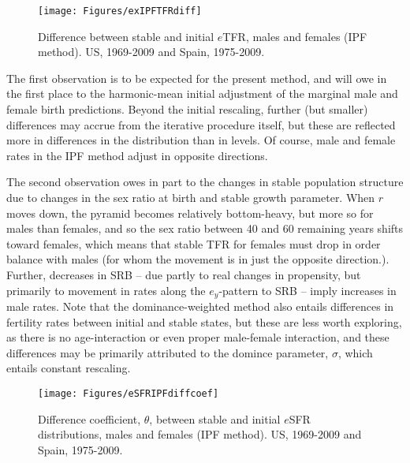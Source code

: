 \begin{figure}[ht!]
        \centering  
          \caption{Difference between stable and initial $e$TFR, males and
          females (IPF method). US, 1969-2009 and Spain,
          1975-2009.}
           \texttt{[image: Figures/exIPFTFRdiff]}
          \label{fig:exIPFTFRdiff}
\end{figure}

The first observation
is to be expected for the present method, and will owe in the first place to the
harmonic-mean initial adjustment of the marginal male and female birth
predictions. Beyond the initial rescaling, further (but smaller) differences may
accrue from the iterative procedure itself, but these are reflected more in
differences in the distribution than in levels. Of course, male and female rates
in the IPF method adjust in opposite directions. 

The second observation owes
in part to the changes in stable population structure due to changes in the sex
ratio at birth and stable growth parameter. When $r$ moves down, the pyramid
becomes relatively bottom-heavy, but more so for males than females, and so the
sex ratio between 40 and 60 remaining years shifts toward females, which means
that stable TFR for females must drop in order balance with males (for whom the
movement is in just the opposite direction.). Further, decreases in SRB -- due
partly to real changes in propensity, but primarily to movement in rates
along the $e_y$-pattern to SRB -- imply increases in male rates. Note that the
dominance-weighted method also entails differences in fertility rates
between initial and stable states, but these are less worth exploring, as there
is no age-interaction or even proper male-female interaction, and these
differences may be primarily attributed to the domince parameter, $\sigma$,
which entails constant rescaling.

\begin{figure}[ht!]
        \centering  
          \caption{Difference coefficient, $\theta$, between stable and initial
          $e$SFR distributions, males and females (IPF method). US, 1969-2009
          and Spain, 1975-2009.}
           \texttt{[image: Figures/eSFRIPFdiffcoef]}
          \label{fig:exIPFdiffcoef}
\end{figure}

